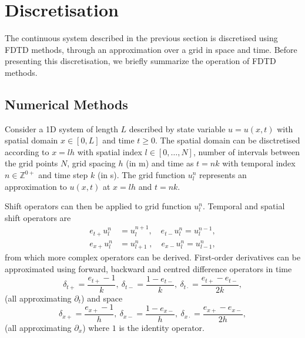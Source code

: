 \section{Discretisation}\label{sec:discrete}
The continuous system described in the previous section is discretised using FDTD methods, through an approximation over a grid in space and time. Before presenting this discretisation, we briefly summarize the operation of FDTD methods.

\subsection{Numerical Methods}\label{sec:numMeth}
Consider a 1D system of length $L$ described by state variable $u = u(x,t)$ with spatial domain $x\in [0, L]$ and time $t\geq 0$. The spatial domain can be disctretised according to $x=lh$ with spatial index $l \in [0, \hdots, N]$, number of intervals between the grid points $N$, grid spacing $h$ (in m) and time as $t=nk$ with temporal index $n \in \mathbb{Z}^{0+}$ and time step $k$ (in s). The grid function $u_l^n$ represents an approximation to $u(x,t)$ at $x=lh$ and $t=nk$. 

Shift operators can then be applied to grid function $u_l^n$. Temporal and spatial shift operators are
\begin{equation}
    \begin{aligned}
        e_{t+}u_l^n &= u_l^{n+1}, \quad e_{t-}u_l^n = u_l^{n-1},\\
        e_{x+}u_l^n &= u_{l+1}^n\;, \quad \!e_{x-}u_l^n = u_{l-1}^n,
    \end{aligned}
\end{equation}
from which more complex operators can be derived.
First-order derivatives can be approximated using forward, backward and centred difference operators in time
\begin{equation}\label{eq:discTimeOperators}
    \delta_{t+} = \frac{e_{t+} - 1}{k},\ \delta_{t-} = \frac{1 - e_{t-}}{k},\ \delta_{t\cdot} = \frac{e_{t+}-e_{t-}}{2k},
\end{equation}
(all approximating $\partial_t$) and space
\begin{equation}\label{eq:discSpaceOperators}
    \delta_{x+} = \frac{e_{x+} - 1}{h},\ \delta_{x-} = \frac{1 - e_{x-}}{h},\ \delta_{x\cdot} = \frac{e_{x+}-e_{x-}}{2h},
\end{equation} 
(all approximating $\partial_x$) where $1$ is the identity operator.

